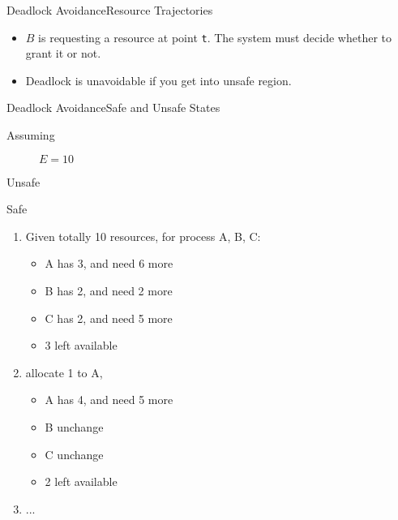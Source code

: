 \begin{frame}{Deadlock Avoidance}{Resource Trajectories}
  \begin{center}
  \end{center}
  \begin{itemize}
  \item $B$ is requesting a resource at point \texttt{t}. The system must decide whether
    to grant it or not.
  \item Deadlock is unavoidable if you get into \alert{unsafe region}.
  \end{itemize}
\end{frame}

\begin{frame}{Deadlock Avoidance}{Safe and Unsafe States}
  \begin{description}
    \item[Assuming] $E=10$
  \end{description}
  \begin{block}{Unsafe}
    \begin{center}
       
    \end{center}
  \end{block}
  \begin{block}{Safe}
    \begin{center}
       
    \end{center}
  \end{block}
\end{frame}

\begin{enumerate}
\item Given totally 10 resources, for process A, B, C:
  \begin{itemize}
  \item A has 3, and need 6 more
  \item B has 2, and need 2 more
  \item C has 2, and need 5 more
  \item 3 left available
  \end{itemize}
\item allocate 1 to A,
  \begin{itemize}
  \item A has 4, and need 5 more
  \item B unchange
  \item C unchange
  \item 2 left available
  \end{itemize}
\item ...
\end{enumerate}

